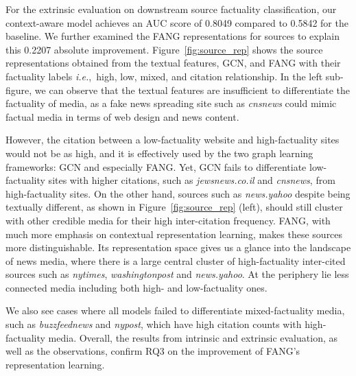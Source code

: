\documentclass[sigconf]{acmart}
\theoremstyle{definition}
\theoremstyle{hypothesis}
\begin{document}
For the extrinsic evaluation on downstream source factuality classification, our context-aware model achieves an AUC score of 0.8049 compared to 0.5842 for the baseline. We further examined the FANG representations for sources to explain this 0.2207 absolute improvement. Figure~\ref{fig:source_rep} shows the source representations obtained from the textual features, GCN, and FANG with their factuality labels \textit{i.e.},~high, low, mixed, and citation relationship. In the left sub-figure, we can observe that the textual features are insufficient to differentiate the factuality of media, as a fake news spreading site such as \textit{cnsnews}
could mimic factual media in terms of web design and news content.

However, the citation between a low-factuality website and high-factuality sites would not be as high, and it is effectively used by the two graph learning frameworks: GCN and especially FANG. 
Yet, GCN fails to differentiate low-factuality sites with higher citations, such as \textit{jewsnews.co.il} and \textit{cnsnews}, from high-factuality sites. On the other hand, sources such as \textit{news.yahoo}
despite being textually different, as shown in Figure~\ref{fig:source_rep} (left), should still cluster with other credible media for their high inter-citation frequency. FANG, with much more emphasis on contextual representation learning, makes these sources more distinguishable. Its representation space gives us a glance into the landscape of news media, where there is a large central cluster of high-factuality inter-cited sources such as \textit{nytimes},
\textit{washingtonpost}
and \textit{news.yahoo}. At the periphery lie less connected media including both high- and low-factuality ones.

We also see cases where all models failed to differentiate mixed-factuality media, such as \textit{buzzfeednews} and
\textit{nypost},
which have high citation counts with high-factuality media.
Overall, the results from intrinsic and extrinsic evaluation, as well as the observations, confirm RQ3 on the improvement of FANG's representation learning.
\end{document}
